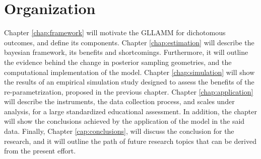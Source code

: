 
\section{Organization}

Chapter \ref{chap:framework} will motivate the GLLAMM for dichotomous outcomes, and define its components. Chapter \ref{chap:estimation} will describe the bayesian framework, its benefits and shortcomings. Furthermore, it will outline the evidence behind the change in posterior sampling geometries, and the computational implementation of the model. Chapter \ref{chap:simulation} will show the results of an empirical simulation study designed to assess the benefits of the re-parametrization, proposed in the previous chapter. Chapter \ref{chap:application} will describe the instruments, the data collection process, and scales under analysis, for a large standardized educational assessment. In addition, the chapter will show the conclusions achieved by the application of the model in the said data. Finally, Chapter \ref{cap:conclusions}, will discuss the conclusion for the research, and it will outline the path of future research topics that can be derived from the present effort.
